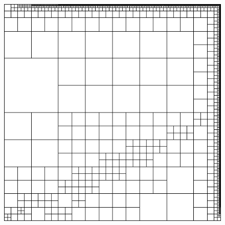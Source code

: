 \documentclass[mathserif]{beamer}
\begin{document}
\begin{frame}
{\begin{columns}[b]
\begin{column}{0.5\textwidth}
\begin{figure}[t]
\includegraphics[width=1.0\textwidth]{../figs/Confusion/robust8c_mesh.png}
\end{figure}
\end{column}
\end{columns}
}
\end{frame}

\end{document}

